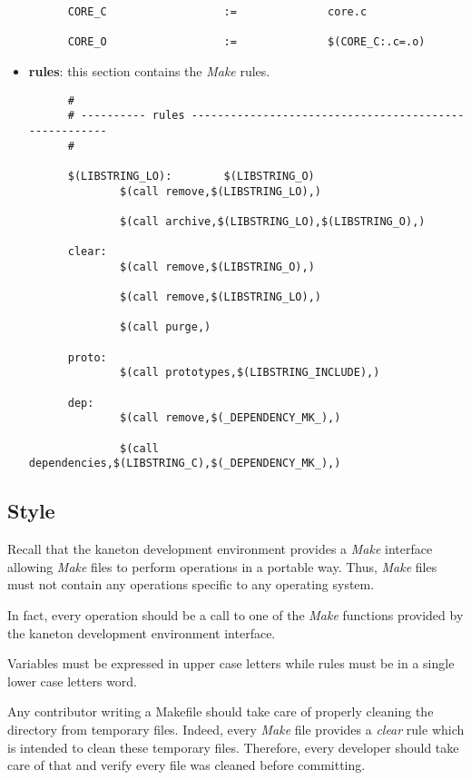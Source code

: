 \begin{itemize}
\begin{verbatim}
      CORE_C                  :=              core.c

      CORE_O                  :=              $(CORE_C:.c=.o)
    \end{verbatim}
  \item
    \textbf{rules}: this section contains the \textit{Make} rules.

    \begin{verbatim}
      #
      # ---------- rules ------------------------------------------------------
      #

      $(LIBSTRING_LO):        $(LIBSTRING_O)
              $(call remove,$(LIBSTRING_LO),)

              $(call archive,$(LIBSTRING_LO),$(LIBSTRING_O),)

      clear:
              $(call remove,$(LIBSTRING_O),)

              $(call remove,$(LIBSTRING_LO),)

              $(call purge,)

      proto:
              $(call prototypes,$(LIBSTRING_INCLUDE),)

      dep:
              $(call remove,$(_DEPENDENCY_MK_),)

              $(call dependencies,$(LIBSTRING_C),$(_DEPENDENCY_MK_),)
    \end{verbatim}
\end{itemize}


\subsection{Style}

Recall that the kaneton development environment provides a \textit{Make}
interface allowing \textit{Make} files to perform operations in a portable
way. Thus, \textit{Make} files must not contain any operations specific
to any operating system.

In fact, every operation should be a call to one of the \textit{Make} functions
provided by the kaneton development environment interface.

Variables must be expressed in upper case letters while rules must be in a
single lower case letters word.

Any contributor writing a Makefile should take care of properly cleaning
the directory from temporary files. Indeed, every \textit{Make} file
provides a \textit{clear} rule which is intended to clean these temporary
files. Therefore, every developer should take care of that and verify every
file was cleaned before committing.

